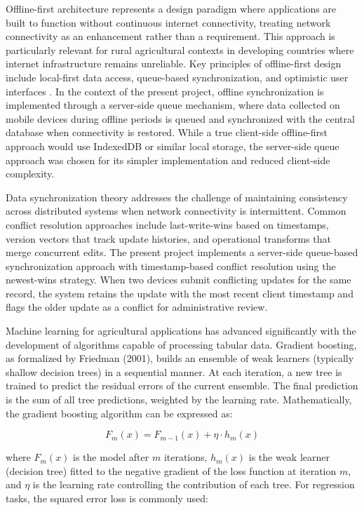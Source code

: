 \documentclass[12pt,a4paper,oneside]{report}
\begin{document}
Offline-first architecture represents a design paradigm where applications are built to function without continuous internet connectivity, treating network connectivity as an enhancement rather than a requirement. This approach is particularly relevant for rural agricultural contexts in developing countries where internet infrastructure remains unreliable. Key principles of offline-first design include local-first data access, queue-based synchronization, and optimistic user interfaces \cite{islam2021}. In the context of the present project, offline synchronization is implemented through a server-side queue mechanism, where data collected on mobile devices during offline periods is queued and synchronized with the central database when connectivity is restored. While a true client-side offline-first approach would use IndexedDB or similar local storage, the server-side queue approach was chosen for its simpler implementation and reduced client-side complexity.

Data synchronization theory addresses the challenge of maintaining consistency across distributed systems when network connectivity is intermittent. Common conflict resolution approaches include last-write-wins based on timestamps, version vectors that track update histories, and operational transforms that merge concurrent edits. The present project implements a server-side queue-based synchronization approach with timestamp-based conflict resolution using the newest-wins strategy. When two devices submit conflicting updates for the same record, the system retains the update with the most recent client timestamp and flags the older update as a conflict for administrative review.

Machine learning for agricultural applications has advanced significantly with the development of algorithms capable of processing tabular data. Gradient boosting, as formalized by Friedman (2001), builds an ensemble of weak learners (typically shallow decision trees) in a sequential manner. At each iteration, a new tree is trained to predict the residual errors of the current ensemble. The final prediction is the sum of all tree predictions, weighted by the learning rate. Mathematically, the gradient boosting algorithm can be expressed as:

\begin{equation}
F_m(x) = F_{m-1}(x) + \eta \cdot h_m(x)
\end{equation}

where \(F_m(x)\) is the model after \(m\) iterations, \(h_m(x)\) is the weak learner (decision tree) fitted to the negative gradient of the loss function at iteration \(m\), and \(\eta\) is the learning rate controlling the contribution of each tree. For regression tasks, the squared error loss is commonly used:
\end{document}
